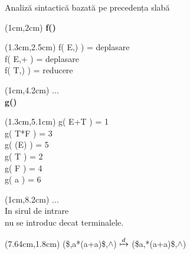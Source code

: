 \documentclass[pdf]{beamer}
\begin{document}
\begin{frame}{Analiză sintactică bazată pe precedența slabă}

\begin{textblock*}{15.8cm}(1cm,2cm)
\color{red} \textbf {f()}
\end{textblock*}

\begin{textblock*}{15.8cm}(1.3cm,2.5cm)
\color{black}
    f( E,) ) = deplasare \\
    f( E,+ ) = deplasare \\
    f( T,) ) =  reducere
\end{textblock*}

\begin{textblock*}{15.8cm}(1cm,4.2cm)
... \\
\color{red} \textbf {g()}
\end{textblock*}

\begin{textblock*}{15.8cm}(1.3cm,5.1cm)
\color{black}
    g( E+T ) = 1 \\
    g( T*F ) = 3 \\ 
    g( (E) ) = 5 \\
    g( T ) = 2   \\
    g( F ) = 4   \\
    g( a ) = 6   
\end{textblock*}

\begin{textblock*}{15.8cm}(1cm,8.2cm)
... \\
In sirul de intrare \\
nu se introduc decat terminalele.
\end{textblock*}

\begin{textblock*}{15.8cm}(7.64cm,1.8cm)
\tiny
(\$,a*(a+a)\$,$\land$) $\xmapsto{d}$ (\$a,*(a+a)\$,$\land$)
\end{textblock*}


\end{frame}
\end{document}
